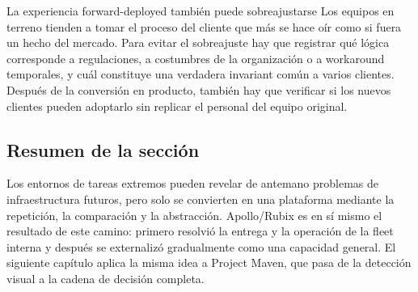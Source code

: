 \begin{warningbox}{La experiencia forward-deployed también puede sobreajustarse}
Los equipos en terreno tienden a tomar el proceso del cliente que más se hace oír como si fuera un hecho del mercado. Para evitar el sobreajuste hay que registrar qué lógica corresponde a regulaciones, a costumbres de la organización o a workaround temporales, y cuál constituye una verdadera invariant común a varios clientes. Después de la conversión en producto, también hay que verificar si los nuevos clientes pueden adoptarlo sin replicar el personal del equipo original.
\end{warningbox}

\subsection{Resumen de la sección}

Los entornos de tareas extremos pueden revelar de antemano problemas de infraestructura futuros, pero solo se convierten en una plataforma mediante la repetición, la comparación y la abstracción. Apollo/Rubix es en sí mismo el resultado de este camino: primero resolvió la entrega y la operación de la fleet interna y después se externalizó gradualmente como una capacidad general. El siguiente capítulo aplica la misma idea a Project Maven, que pasa de la detección visual a la cadena de decisión completa.
